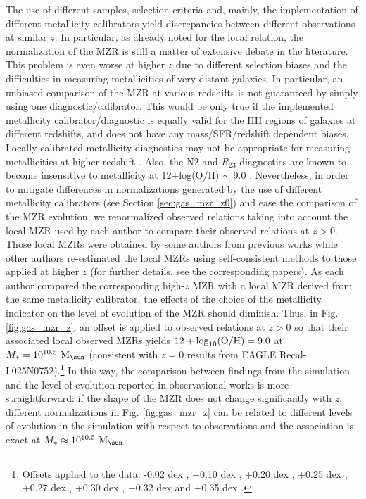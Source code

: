 \documentclass[useAMS,usenatbib]{mn2e}
\begin{document}
The use of different samples, selection criteria and, mainly,
the implementation of different metallicity calibrators yield discrepancies between 
different observations at similar $z$.
In particular, as already noted for the local relation, 
the normalization of the MZR is still a matter of extensive
debate in the literature. This problem is even worse at higher $z$ due to different selection
biases and the difficulties in measuring metallicities of very distant galaxies. 
In particular, an unbiased comparison of the MZR at
various redshifts is not guaranteed by simply using one diagnostic/calibrator.
This would be only true if the implemented metallicity calibrator/diagnostic is equally valid for
the HII regions of galaxies at
different redshifts, and does not have any mass/SFR/redshift dependent biases.
Locally calibrated metallicity diagnostics may not be appropriate for measuring
metallicities at higher redshift \citep{steidel2014, strom2017}.
Also, the N2 and $R_{23}$ diagnostics are known to become insensitive to metallicity
at 12+log(O/H) $\sim$ 9.0 \citep[e.g.][]{kewley2002, liang2006}.
Nevertheless, in order to mitigate differences in normalizations generated by the use of different
metallicity calibrators (see Section \ref{sec:gas_mzr_z0}) and ease the comparison of the MZR
evolution, we renormalized observed relations taking into account
the local MZR used by each author to compare their observed relations at $z>0$.
Those local MZRs were obtained by some authors from previous works while
other authors re-estimated the local MZRs using self-consistent methods to those applied
at higher $z$
(for further details, see the corresponding papers). 
As each author compared the corresponding high-$z$ MZR with a local MZR
derived from the same metallicity calibrator, 
the effects of the choice of the metallicity indicator
on the level of evolution of the MZR should diminish.
Thus, in Fig. \ref{fig:gas_mzr_z}, an offset
is applied to observed relations at $z>0$ so that their associated
local observed MZRs yields $12 + {\log}_{10}({\rm O/H}) = 9.0$ at 
$M_* = 10^{10.5} \ {\rm M_{\sun}}$ (consistent with $z=0$ results from
{\sc EAGLE} Recal-L025N0752).\footnote{
Offsets applied to the data: 
-0.02 dex \citep{maiolino2008, troncoso2014, onodera2016},
+0.10 dex \citep{delosreyes2015}, 
+0.20 dex \citep{ly2016}, 
+0.25 dex \citep{sanders2015},
+0.27 dex \citep{hunt2016},
+0.30 dex \citep{cullen2014},
+0.32 dex \citep{zahid2014, wuyts2016} and 
+0.35 dex \citep{stott2013, yabe2013}.}
In this way, the comparison between findings from the simulation and the level of evolution reported
in observational works 
is more straightforward: if the shape of the MZR does not change significantly with $z$,
different normalizations in Fig. \ref{fig:gas_mzr_z} can be related to different levels 
of evolution in the simulation with respect to observations and the association is exact at  
$M_* \approx 10^{10.5} \ {\rm M}_{\sun}$.
\end{document}
